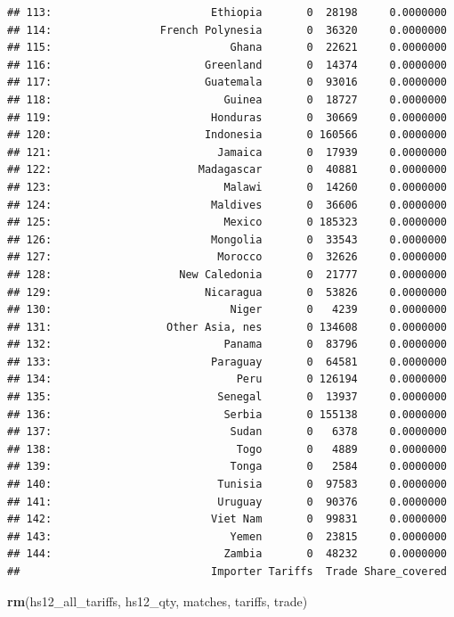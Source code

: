 \documentclass[10pt,]{article}
\newenvironment{Shaded}{\begin{snugshade}}{\end{snugshade}}
\newcommand{\KeywordTok}[1]{\textcolor[rgb]{0.13,0.29,0.53}{\textbf{{#1}}}}
\newcommand{\NormalTok}[1]{{#1}}
\begin{document}
\begin{verbatim}
## 113:                         Ethiopia       0  28198     0.0000000
## 114:                 French Polynesia       0  36320     0.0000000
## 115:                            Ghana       0  22621     0.0000000
## 116:                        Greenland       0  14374     0.0000000
## 117:                        Guatemala       0  93016     0.0000000
## 118:                           Guinea       0  18727     0.0000000
## 119:                         Honduras       0  30669     0.0000000
## 120:                        Indonesia       0 160566     0.0000000
## 121:                          Jamaica       0  17939     0.0000000
## 122:                       Madagascar       0  40881     0.0000000
## 123:                           Malawi       0  14260     0.0000000
## 124:                         Maldives       0  36606     0.0000000
## 125:                           Mexico       0 185323     0.0000000
## 126:                         Mongolia       0  33543     0.0000000
## 127:                          Morocco       0  32626     0.0000000
## 128:                    New Caledonia       0  21777     0.0000000
## 129:                        Nicaragua       0  53826     0.0000000
## 130:                            Niger       0   4239     0.0000000
## 131:                  Other Asia, nes       0 134608     0.0000000
## 132:                           Panama       0  83796     0.0000000
## 133:                         Paraguay       0  64581     0.0000000
## 134:                             Peru       0 126194     0.0000000
## 135:                          Senegal       0  13937     0.0000000
## 136:                           Serbia       0 155138     0.0000000
## 137:                            Sudan       0   6378     0.0000000
## 138:                             Togo       0   4889     0.0000000
## 139:                            Tonga       0   2584     0.0000000
## 140:                          Tunisia       0  97583     0.0000000
## 141:                          Uruguay       0  90376     0.0000000
## 142:                         Viet Nam       0  99831     0.0000000
## 143:                            Yemen       0  23815     0.0000000
## 144:                           Zambia       0  48232     0.0000000
##                              Importer Tariffs  Trade Share_covered
\end{verbatim}

\begin{Shaded}
\begin{Highlighting}[]
\KeywordTok{rm}\NormalTok{(hs12_all_tariffs, hs12_qty, matches, tariffs, trade)}
\end{Highlighting}
\end{Shaded}
\end{document}
